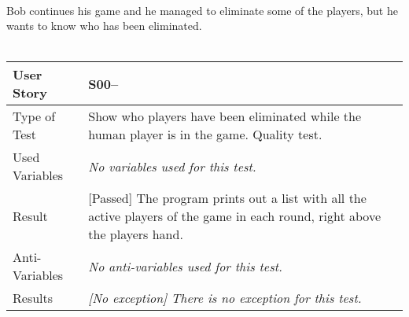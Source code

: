 \vspace{0.8cm}\\
Bob continues his game and he managed to eliminate some of the players, but he wants to know who has been eliminated.\\
\vspace{0.2cm}\\
\begin{tabular}{l | p{10cm}}
User Story & \textbf{S00--}\\ \hline
Type of Test & Show who players have been eliminated while the human player is in the game. Quality test.\\ \hline
Used Variables & \textit{No variables used for this test.}\\ \hline
Result & [Passed] The program prints out a list with all the active players of the game in each round, right above the players hand.\\ \hline
Anti-Variables & \textit{No anti-variables used for this test.}\\ \hline
Results & \textit{[No exception] There is no exception for this test.}\\ \hline
\end{tabular}

